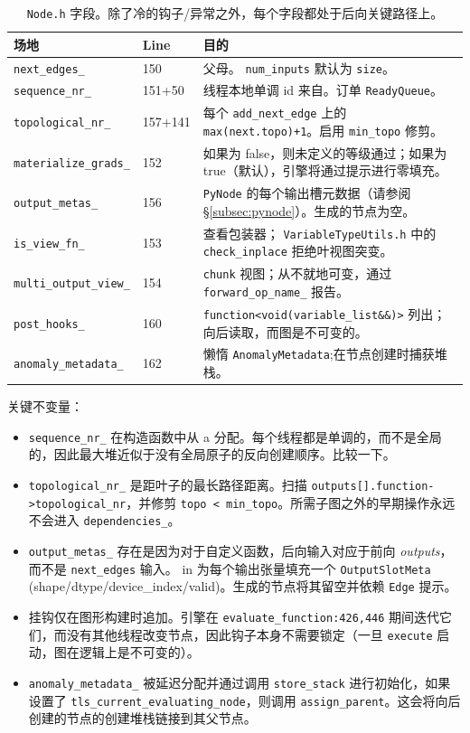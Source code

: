 \begin{table}[H]
\centering
\caption{\texttt{Node.h} 字段。除了冷的钩子/异常之外，每个字段都处于后向关键路径上。}
\label{tab:nodefields}
\small
\begin{tabular}{lll}
\toprule
场地 & Line & 目的 \\
\midrule
\texttt{next\_edges\_} & 150 & 父母。 \texttt{num\_inputs} 默认为 \texttt{size}。 \\
\texttt{sequence\_nr\_} & 151+50 & 线程本地单调 id 来自。订单 \texttt{ReadyQueue}。 \\
\texttt{topological\_nr\_} & 157+141 & 每个 \texttt{add\_next\_edge} 上的 \texttt{max(next.topo)+1}。启用 \texttt{min\_topo} 修剪。 \\
\texttt{materialize\_grads\_} & 152 & 如果为 false，则未定义的等级通过；如果为 true（默认），引擎将通过提示进行零填充。 \\
\texttt{output\_metas\_} & 156 & \texttt{PyNode} 的每个输出槽元数据（请参阅 \S\ref{subsec:pynode}）。生成的节点为空。 \\
\texttt{is\_view\_fn\_} & 153 & 查看包装器； \texttt{VariableTypeUtils.h} 中的 \texttt{check\_inplace} 拒绝叶视图突变。 \\
\texttt{multi\_output\_view\_} & 154 & \texttt{chunk} 视图；从不就地可变，通过 \texttt{forward\_op\_name\_} 报告。 \\
\texttt{post\_hooks\_} & 160 & \texttt{function<void(variable\_list\&\&)>} 列出；向后读取，而图是不可变的。 \\
\texttt{anomaly\_metadata\_} & 162 & 懒惰 \texttt{AnomalyMetadata};在节点创建时捕获堆栈。 \\
\bottomrule
\end{tabular}
\end{table}

关键不变量：

\begin{itemize}[leftmargin=1.2em]
\item \texttt{sequence\_nr\_} 在构造函数中从 a 分配。每个线程都是单调的，而不是全局的，因此最大堆近似于没有全局原子的反向创建顺序。比较一下。
\item \texttt{topological\_nr\_} 是距叶子的最长路径距离。扫描 \texttt{outputs[].function->topological\_nr}，并修剪 \texttt{topo < min\_topo}。所需子图之外的早期操作永远不会进入 \texttt{dependencies\_}。
\item \texttt{output\_metas\_} 存在是因为对于自定义函数，后向输入对应于前向 \emph{outputs}，而不是 \texttt{next\_edges} 输入。 in 为每个输出张量填充一个 \texttt{OutputSlotMeta} (shape/dtype/device\_index/valid)。生成的节点将其留空并依赖 \texttt{Edge} 提示。
\item 挂钩仅在图形构建时追加。引擎在 \texttt{evaluate\_function:426,446} 期间迭代它们，而没有其他线程改变节点，因此钩子本身不需要锁定（一旦 \texttt{execute} 启动，图在逻辑上是不可变的）。
\item \texttt{anomaly\_metadata\_} 被延迟分配并通过调用 \texttt{store\_stack} 进行初始化，如果设置了 \texttt{tls\_current\_evaluating\_node}，则调用 \texttt{assign\_parent}。这会将向后创建的节点的创建堆栈链接到其父节点。
\end{itemize}

